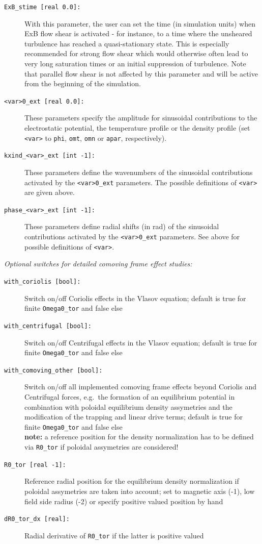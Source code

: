 \documentclass[12pt]{article}
\begin{document}
\begin{description}
\item[\texttt{ExB\_stime [real 0.0]:}] With this parameter, the user can set the time (in simulation units)
  when ExB flow shear is activated - for instance, to a time where the unsheared turbulence has reached a quasi-stationary 
  state. This is especially recommended for strong flow shear which would otherwise
  often lead to very long saturation times or an initial suppression of turbulence. 
  Note that parallel flow shear is not affected by this parameter and will be active from the beginning of the simulation.
\item[\texttt{<var>0\_ext [real 0.0]:}] These parameters specify the amplitude for sinusoidal contributions to
  the electrostatic potential, the temperature profile or the density profile (set \texttt{<var>} to \texttt{phi}, 
  \texttt{omt}, \texttt{omn} or \texttt{apar}, respectively).
\item[\texttt{kxind\_<var>\_ext [int -1]:}] These parameters define the wavenumbers of the sinusoidal 
  contributions activated by the \texttt{<var>0\_ext} parameters. The possible definitions of \texttt{<var>}
  are given above.
\item[\texttt{phase\_<var>\_ext [int -1]:}] These parameters define radial shifts (in rad) of the sinusoidal 
  contributions activated by the \texttt{<var>0\_ext} parameters. See above for possible definitions of \texttt{<var>}.
\end{description}
{\em Optional switches for detailed comoving frame effect studies:}
\begin{description}
\item[\texttt{with\_coriolis [bool]:}] Switch on/off Coriolis effects in the Vlasov equation; default is true for finite {\tt Omega0\_tor} and false else
\item[\texttt{with\_centrifugal [bool]:}] Switch on/off Centrifugal effects in the Vlasov equation; default is true for finite {\tt Omega0\_tor} and false else
\item[\texttt{with\_comoving\_other [bool]:}] Switch on/off all implemented comoving frame effects beyond Coriolis and Centrifugal forces, e.g.~the formation of an equilibrium potential in combination with poloidal equilibrium density assymetries and the modification of the trapping and linear drive terms; default is true for finite {\tt Omega0\_tor} and false else\\
{\bf note:} a reference position for the density normalization has to be defined via {\tt R0\_tor} if poloidal assymetries are considered!
\item[\texttt{R0\_tor [real -1]:}] Reference radial position for the equilibrium density normalization if poloidal assymetries are taken into account; set to magnetic axis (-1), low field side radius (-2) or specify positive valued position by hand
\item[\texttt{dR0\_tor\_dx [real]:}] Radial derivative of {\tt R0\_tor} if the latter is positive valued
\end{description}
\end{document}
